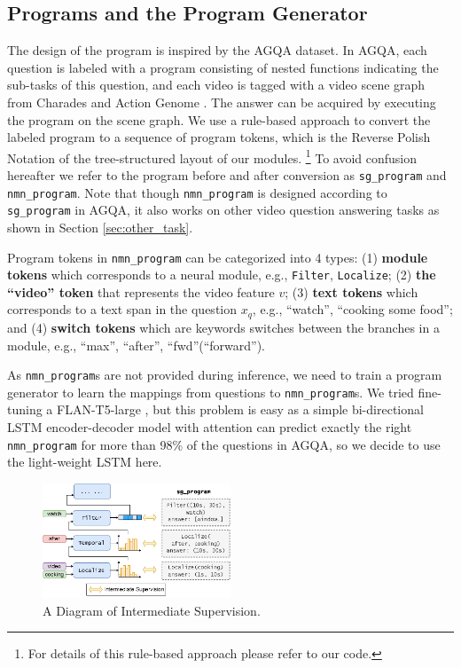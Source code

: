\documentclass[letterpaper]{article} %
\begin{document}
\subsection{Programs and the Program Generator}
The design of the program is inspired by the AGQA dataset. In AGQA, each question is labeled with a program consisting of nested functions indicating the sub-tasks of this question, and each video is tagged with a video scene graph from Charades and Action Genome \cite{sigurdsson2016hollywood,Ji2019ActionGA}. The answer can be acquired by executing the program on the scene graph. We use a rule-based approach to convert the labeled program to a sequence of program tokens, which is the Reverse Polish Notation of the tree-structured layout of our modules. \footnote{For details of this rule-based approach please refer to our code.} To avoid confusion hereafter we refer to the program before and after conversion as \texttt{sg\_program} and \texttt{nmn\_program}. Note that though \texttt{nmn\_program} is designed according to \texttt{sg\_program} in AGQA, it also works on other video question answering tasks as shown in Section \ref{sec:other_task}.

Program tokens in \texttt{nmn\_program} can be categorized into 4 types: (1) \textbf{module tokens} which corresponds to a neural module, e.g., \texttt{Filter}, \texttt{Localize}; (2) \textbf{the ``video'' token} that represents the video feature $v$; (3) \textbf{text tokens} which corresponds to a text span in the question $x_q$, e.g., ``watch'', ``cooking some food''; and (4) \textbf{switch tokens} which are keywords switches between the branches in a module, e.g., ``max'', ``after'', ``fwd''(``forward'').

As \texttt{nmn\_program}s are not provided during inference, we need to train a program generator to learn the mappings from questions to \texttt{nmn\_program}s. We tried fine-tuning a FLAN-T5-large \cite{wei2021finetunedLM}, but this problem is easy as a simple bi-directional LSTM encoder-decoder model with attention can predict exactly the right \texttt{nmn\_program} for more than 98\% of the questions in AGQA, so we decide to use the light-weight LSTM here.

\begin{figure}[t]
    \centering
    \includegraphics[width=0.5\textwidth]{plt/intermediate_supervision.png}
    \caption{A Diagram of Intermediate Supervision.}
    \label{fig:intermediate_supervision}
\end{figure}
\end{document}
